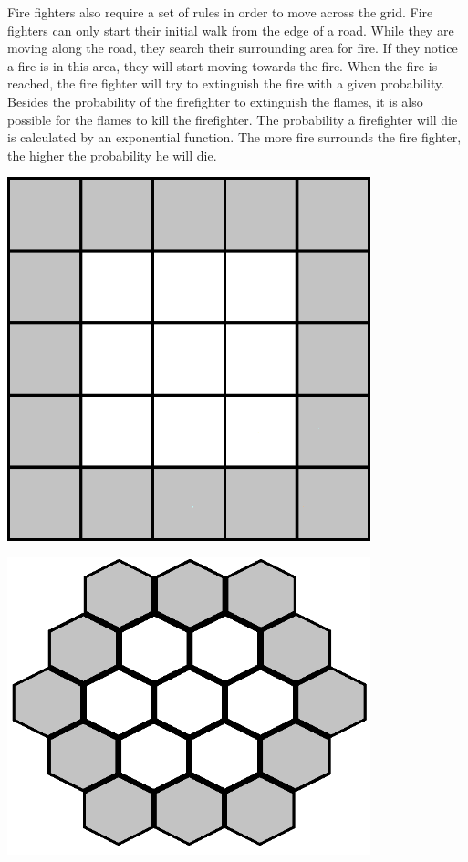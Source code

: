 \documentclass{article}
\newenvironment{Figure}
  {\par\medskip\noindent\minipage{\linewidth}}
  {\endminipage\par\medskip}
\begin{document}
\begin{multicols}{2}
Fire fighters also require a set of rules in order to move across the grid. Fire fighters can only start their initial walk from the edge of a road. While they are moving along the road, they search their surrounding area for fire. If they notice a fire is in this area, they will start moving towards the fire. When the fire is reached, the fire fighter will try to extinguish the fire with a given probability. Besides the probability of the firefighter to extinguish the flames, it is also possible for the flames to kill the firefighter. The probability a firefighter will die is calculated by an exponential function. The more fire surrounds the fire fighter, the higher the probability he will die.
\begin{Figure}
 \centering
 \includegraphics[width=0.79\textwidth]{imgs/extendedcartesian.png}
\label{fig:extcartesianstd}
\end{Figure}
\begin{Figure}
 \centering
 \includegraphics[width=0.79\textwidth]{imgs/extendedhexagonal.png}

\end{Figure}
\end{multicols}
\end{document}
